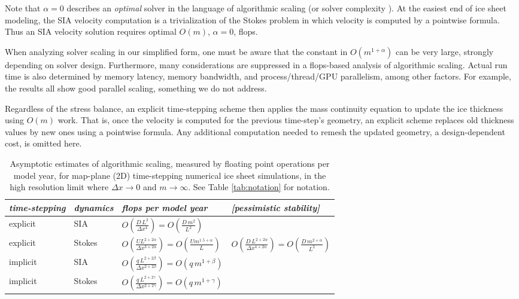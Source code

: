 \documentclass[twocolumn,letterpaper]{igs}
\begin{document}
Note that $\alpha=0$ describes an \emph{optimal} solver in the language of algorithmic scaling (or solver complexity \citep{Bueler2021}).  At the easiest end of ice sheet modeling, the SIA velocity computation is a trivialization of the Stokes problem in which velocity is computed by a pointwise formula.  Thus an SIA velocity solution requires optimal $O(m)$, $\alpha=0$, flops.

When analyzing solver scaling in our simplified form, one must be aware that the constant in $O(m^{1+\alpha})$ can be very large, strongly depending on solver design.  Furthermore, many considerations are suppressed in a flops-based analysis of algorithmic scaling.  Actual run time is also determined by memory latency, memory bandwidth, and process/thread/GPU parallelism, among other factors.  For example, the \cite{BrownSmithAhmadia2013,Fischleretal2022,IsaacStadlerGhattas2015,Lengetal2012,Tuminaroetal2016} results all show good parallel scaling, something we do not address.

Regardless of the stress balance, an explicit time-stepping scheme then applies the mass continuity equation to update the ice thickness using $O(m)$ work.  That is, once the velocity is computed for the previous time-step's geometry, an explicit scheme replaces old thickness values by new ones using a pointwise formula.  Any additional computation needed to remesh the updated geometry, a design-dependent cost, is omitted here.

\newcommand{\oo}[1]{\displaystyle O\left(#1\right)}
\setlength{\tabcolsep}{5pt}
\renewcommand{\arraystretch}{1.5}
\begin{table*}[ht]
{\normalsize
\begin{tabular}{llll}
\emph{time-stepping} & \emph{dynamics} & \emph{flops per model year} & \emph{[pessimistic stability]} \\ \hline
explicit & SIA    & $\oo{\frac{D\, L^2}{\Delta x^4}} = \oo{\frac{D\, m^2}{L^2}}${\Huge \strut} \\
explicit & Stokes & $\oo{\frac{U L^{2+2\alpha}}{\Delta x^{3+2\alpha}}} = \oo{\frac{U m^{1.5+\alpha}}{L}}${\Huge \strut}\phantom{x} & $\oo{\frac{D\, L^{2+2\alpha}}{\Delta x^{4+2\alpha}}} = \oo{\frac{D\,m^{2+\alpha}}{L^2}}$ \\
implicit & SIA    & $\oo{\frac{q\, L^{2+2\beta}}{\Delta x^{2+2\beta}}} = \oo{q\, m^{1+\beta}}${\Huge \strut} \\
implicit & Stokes & $\oo{\frac{q\, L^{2+2\gamma}}{\Delta x^{2+2\gamma}}} = \oo{q\, m^{1+\gamma}}${\Huge \strut}
\end{tabular}
}
\caption{Asymptotic estimates of algorithmic scaling, measured by floating point operations per model year, for map-plane (2D) time-stepping numerical ice sheet simulations, in the high resolution limit where $\Delta x\to 0$ and $m\to\infty$.  See Table \ref{tab:notation} for notation.}
\label{tab:performancemodel}
\end{table*}
\end{document}

